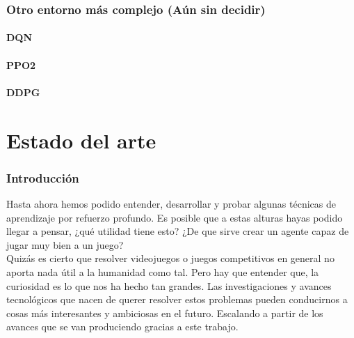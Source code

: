 \documentclass[11pt,fleqn]{book} %
\begin{document}
\section{Otro entorno más complejo (Aún sin decidir)}

\subsection{DQN}

\subsection{PPO2}

\subsection{DDPG}


\part{Estado del arte}

\section*{Introducción}

Hasta ahora hemos podido entender, desarrollar y probar algunas técnicas de aprendizaje por refuerzo profundo. Es posible que a estas alturas hayas podido llegar a pensar, ¿qué utilidad tiene esto? ¿De que sirve crear un agente capaz de jugar muy bien a un juego? \\

Quizás es cierto que resolver videojuegos o juegos competitivos en general no aporta nada útil a la humanidad como tal. Pero hay que entender que, la curiosidad es lo que nos ha hecho tan grandes. Las investigaciones y avances tecnológicos que nacen de querer resolver estos problemas pueden conducirnos a cosas más interesantes y ambiciosas en el futuro. Escalando a partir de los avances que se van produciendo gracias a este trabajo. \\

\end{document}
